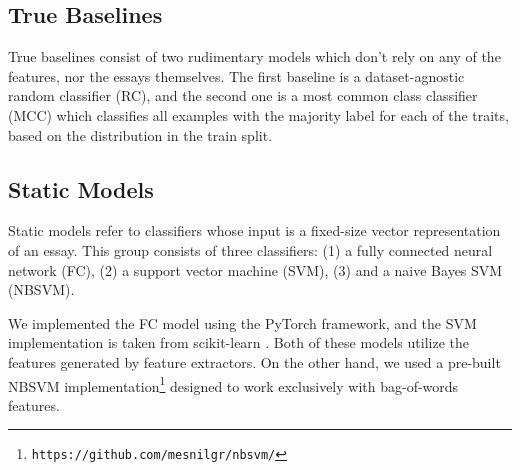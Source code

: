 \documentclass[10pt, a4paper]{article}
\begin{document}
\begin{table*}
\caption{Feature extractors used for static models.}
\label{tab:extractors}
\begin{center}
\end{center}
\end{table*}

\subsection{True Baselines}
True baselines consist of two rudimentary models which don't rely on any of the features, nor the essays themselves. The first baseline is a dataset-agnostic random classifier (RC), and the second one is a most common class classifier (MCC) which classifies all examples with the majority label for each of the traits, based on the distribution in the train split.

\subsection{Static Models}
Static models refer to classifiers whose input is a fixed-size vector representation of an essay. This group consists of three classifiers: (1) a fully connected neural network (FC), (2) a support vector machine (SVM), (3) and a naive Bayes SVM (NBSVM). 

We implemented the FC model using the PyTorch %
framework, and the SVM implementation is taken from scikit-learn%
. Both of these models utilize the features generated by feature extractors. On the other hand, we used a pre-built NBSVM implementation\footnote{\texttt{https://github.com/mesnilgr/nbsvm/}} \citep{nbsvm} designed to work exclusively with bag-of-words features.
\end{document}
